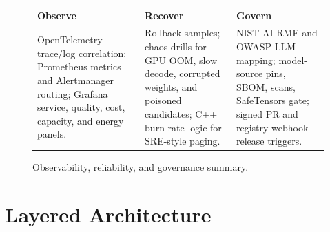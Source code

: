 \documentclass[12pt,a4paper,oneside]{report}
\begin{document}
\begin{figure}[H]
\centering
\small
\begin{tabularx}{\linewidth}{>{\raggedright\arraybackslash}X>{\raggedright\arraybackslash}X>{\raggedright\arraybackslash}X}
\toprule
\textbf{Observe} & \textbf{Recover} & \textbf{Govern} \\
\midrule
OpenTelemetry trace/log correlation; Prometheus metrics and Alertmanager routing; Grafana service, quality, cost, capacity, and energy panels. &
Rollback samples; chaos drills for GPU OOM, slow decode, corrupted weights, and poisoned candidates; C++ burn-rate logic for SRE-style paging. &
NIST AI RMF and OWASP LLM mapping; model-source pins, SBOM, scans, SafeTensors gate; signed PR and registry-webhook release triggers. \\
\bottomrule
\end{tabularx}

\vspace{0.55em}
\caption{Observability, reliability, and governance summary.}
\end{figure}

\section{Layered Architecture}
\end{document}
